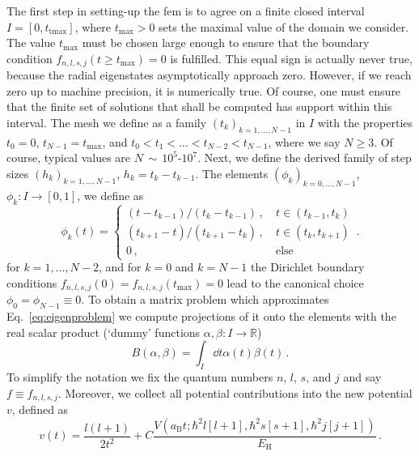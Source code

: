 \documentclass[fontsize=12pt,
               twoside=false,
               BCOR=0mm,
               DIV=14,
               overfullrule=true, %
               toc=bibliography,
               headinclude=true,
               footinclude=false]{scrartcl}
\numberwithin{equation}{section}
\newcommand{\aB}{a_\mathrm{B}}
\newcommand{\EH}{E_\mathrm{H}}
\begin{document}
    The first step in setting-up the \ac{fem} is to agree on a finite closed
    interval $I=[0, t_\mathrm{tmax}]$, where $t_\mathrm{max}>0$ sets the maximal
    value of the domain we consider. The value $t_\mathrm{max}$ must be chosen
    large enough to ensure that the boundary condition
    $f_{n,l,s,j}(t\geq{t}_\mathrm{max})=0$ is fulfilled. This equal sign is
    actually never true, because the radial eigenstates asymptotically approach
    zero. However, if we reach zero up to machine precision, it is numerically
    true. Of course, one must ensure that the finite set of solutions that shall
    be computed has support within this interval. The mesh we define as a family
    $(t_k)_{k=1,\dots,N-1}$ in $I$ with the properties $t_0=0$,
    $t_{N-1}=t_\mathrm{max}$, and $t_0<t_1<\dots<t_{N-2}<t_{N-1}$, where we say
    $N\geq{3}$. Of course, typical values are $N\,{\sim}\,10^5\text{-}10^7$.
    Next, we define the derived family of step sizes $(h_k)_{k=1,\dots,N-1}$,
    $h_k=t_k-t_{k-1}$. The elements $(\phi_k)_{k=0,\dots,N-1}$,
    $\phi_k\colon{I}\to[0,1]$, we define as
    \begin{equation}
        \phi_k(t)
        =
        \begin{cases}
            (t-t_{k-1})\slash(t_k-t_{k-1})\,, \ & t\in(t_{k-1},t_k)
        \\
            (t_{k+1}-t)\slash(t_{k+1}-t_k)\,, \ & t\in(t_k,t_{k+1})
        \\  0                             \,, \ & \text{else}
        \end{cases}
    \,.
    \end{equation}
    for $k=1,\dots,N-2$, and for $k=0$ and $k=N-1$ the Dirichlet boundary
    conditions $f_{n,l,s,j}(0)=f_{n,l,s,j}(t_\mathrm{max})=0$ lead to the
    canonical choice $\phi_0=\phi_{N-1}\equiv0$. To obtain a matrix problem
    which approximates Eq.~\eqref{eq:eigenproblem} we compute projections of it
    onto the elements with the real scalar product (`dummy' functions
    $\alpha,\beta\colon{I}\to\mathbb{R}$)
    \begin{equation}
        B(\alpha,\beta)
        =
        \int_I \dd{t} \alpha(t) \beta(t)
    \,.
    \end{equation}
    To simplify the notation we fix the quantum numbers $n$, $l$, $s$, and $j$
    and say $f\equiv{f_{n,l,s,j}}$. Moreover, we collect all potential
    contributions into the new potential $v$, defined as
    \begin{equation}
        v(t)
        =
        \frac{l(l+1)}{2t^2}
        +C\frac{V(\aB{t};\hbar^2l[l+1],\hbar^2s[s+1],\hbar^2j[j+1])}{\EH}
    \,.
    \end{equation}%
\end{document}
